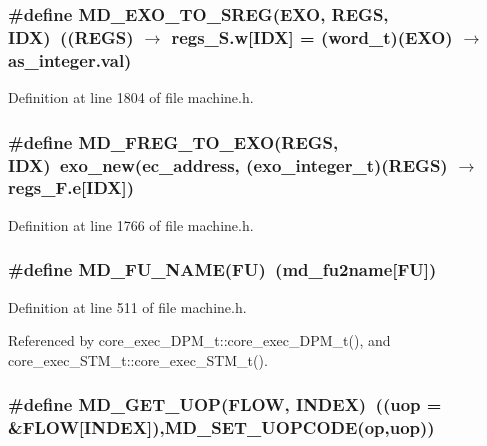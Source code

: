 \subsubsection[{MD\_\-EXO\_\-TO\_\-SREG}]{\setlength{\rightskip}{0pt plus 5cm}\#define MD\_\-EXO\_\-TO\_\-SREG(EXO, \/  REGS, \/  IDX)~((REGS) $\rightarrow$ regs\_\-S.w[IDX] = ({\bf word\_\-t})(EXO) $\rightarrow$ as\_\-integer.val)}\label{machine_8h_d73e6c6b8c1e27d02dca6d852b5b4d6a}




Definition at line 1804 of file machine.h.
\subsubsection[{MD\_\-FREG\_\-TO\_\-EXO}]{\setlength{\rightskip}{0pt plus 5cm}\#define MD\_\-FREG\_\-TO\_\-EXO(REGS, \/  IDX)~exo\_\-new(ec\_\-address, ({\bf exo\_\-integer\_\-t})(REGS) $\rightarrow$ regs\_\-F.e[IDX])}\label{machine_8h_f780a95b70ee72e2c82b4737782e0f1f}




Definition at line 1766 of file machine.h.
\subsubsection[{MD\_\-FU\_\-NAME}]{\setlength{\rightskip}{0pt plus 5cm}\#define MD\_\-FU\_\-NAME(FU)~({\bf md\_\-fu2name}[FU])}\label{machine_8h_cf467ef6d9acd36a197e6af289afdf00}




Definition at line 511 of file machine.h.

Referenced by core\_\-exec\_\-DPM\_\-t::core\_\-exec\_\-DPM\_\-t(), and core\_\-exec\_\-STM\_\-t::core\_\-exec\_\-STM\_\-t().
\subsubsection[{MD\_\-GET\_\-UOP}]{\setlength{\rightskip}{0pt plus 5cm}\#define MD\_\-GET\_\-UOP(FLOW, \/  INDEX)~((uop = \&FLOW[INDEX]),MD\_\-SET\_\-UOPCODE(op,uop))}\label{machine_8h_4482f3079dbf54abd927db1bf3a2f6ec}




